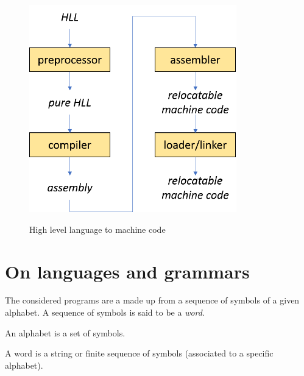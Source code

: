
\begin{figure}[H]
	\centering
	{\includegraphics[width=9cm]{HLLtoMC.png}}

	\label{fig:HLLtoMC}
	\caption{High level language to machine code}
\end{figure}


\section{On languages and grammars}
The considered programs are a made up from a sequence of symbols of a given alphabet. A sequence of symbols is said to be a \textit{word}.

\begin{definition}
	An alphabet is a set of symbols.
\end{definition}

\begin{definition}
	A word is a string or finite sequence of symbols (associated to a specific alphabet).
\end{definition}


